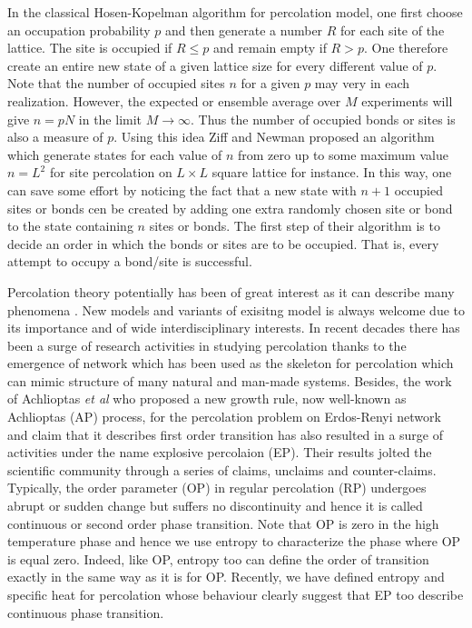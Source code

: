 \documentclass[twocolumn,showpacs,preprintnumbers,amsmath,amssymb]{article}
\begin{document}
In the classical Hosen-Kopelman algorithm for percolation model, one first choose an occupation probability 
$p$ and then generate
a number $R$ for each site of the lattice. The site is occupied if $R\leq p$ and remain empty if $R>p$.
One therefore create an entire new state of a given lattice size for every different value of $p$. Note that
 the number of occupied sites $n$ for a given $p$ may very in each realization. However, the expected or ensemble 
average over $M$ experiments will give $n=pN$ in the limit $M\rightarrow \infty$. Thus the number
of occupied bonds or sites is also a measure of $p$. Using this idea Ziff and Newman proposed an algorithm which generate states for each
value of $n$ from zero up to some maximum value $n=L^2$ for site percolation on $L\times L$ square lattice for
instance. In this way, one can save some effort by noticing 
the fact that a new state with $n+1$ occupied sites or bonds cen be created by adding one extra randomly chosen site or bond
to the state containing $n$ sites or bonds. The first step of their algorithm is to decide an order in which the bonds or
sites are to be occupied. That is, every attempt to occupy a bond/site is successful.

Percolation theory potentially has been of great interest as it can describe
many phenomena \cite{ref.Sahimi}. New models and variants of exisitng model is always
welcome due to its importance and of wide interdisciplinary interests. In recent decades there has been
a surge of research activities in studying percolation thanks to the emergence of network which has
been used as the skeleton for percolation which can mimic structure of many natural and man-made systems. 
Besides, the work of Achlioptas {\it et al} who proposed a new growth rule, now well-known as Achlioptas  (AP) process, 
for the percolation problem on Erdos-Renyi network and claim that it describes first order transition has
also resulted in a surge of activities under the name explosive percolaion (EP). 
Their results jolted the scientific community through a series of claims, unclaims and counter-claims.
Typically,  the order parameter (OP) in regular percolation (RP) undergoes abrupt or sudden change but 
suffers no discontinuity and hence it is called continuous or second order phase transition. 
Note that OP is zero in the high temperature phase and hence we use entropy to characterize
the phase where OP is equal zero. Indeed, like OP, entropy too can define the order of transition exactly
in the same way as it is for OP. Recently, we have defined entropy and specific heat for percolation whose
behaviour clearly suggest that EP too describe continuous phase transition.
\end{document}
